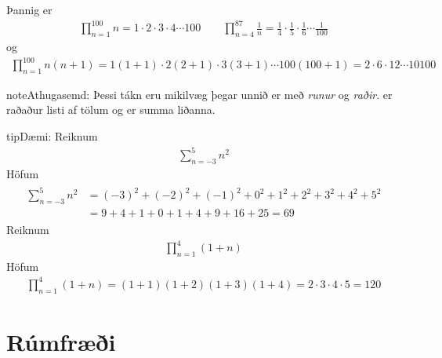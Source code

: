 \documentclass[a4paper,10pt,icelandic]{sphinxmanual}
\begin{document}
Þannig er
\begin{equation*}
\begin{split}\prod_{n=1}^{100}n=1\cdot 2\cdot 3\cdot 4\cdots 100\qquad \prod_{n=4}^{87}\frac{1}{n}=\frac{1}{4}\cdot\frac{1}{5}\cdot\frac{1}{6}\cdots\frac{1}{100}\end{split}
\end{equation*}
og
\begin{equation*}
\begin{split}\prod_{n=1}^{100}n(n+1)=1(1+1)\cdot 2(2+1)\cdot 3(3+1)\cdots 100(100+1)=2\cdot 6\cdot 12 \cdots 10100\end{split}
\end{equation*}
\begin{sphinxadmonition}{note}{Athugasemd:}
Þessi tákn eru mikilvæg þegar unnið er með \textit{runur} og \textit{raðir}.
 er raðaður listi af tölum og  er summa liðanna.
\end{sphinxadmonition}

\begin{sphinxadmonition}{tip}{Dæmi:}
 Reiknum
\begin{equation*}
\begin{split}\sum_{n=-3}^{5}n^2\end{split}
\end{equation*}
Höfum
\begin{equation*}
\begin{split}\begin{aligned}
\sum_{n=-3}^{5}n^2 &=(-3)^2+(-2)^2+(-1)^2+0^2+1^2+2^2+3^2+4^2+5^2 \\ &=9+4+1+0+1+4+9+16+25=69
\end{aligned}\end{split}
\end{equation*}
 Reiknum
\begin{equation*}
\begin{split}\prod_{n=1}^{4}(1+n)\end{split}
\end{equation*}
Höfum
\begin{equation*}
\begin{split}\prod_{n=1}^{4}(1+n)=(1+1)(1+2)(1+3)(1+4)=2\cdot 3\cdot 4\cdot 5=120\end{split}
\end{equation*}\end{sphinxadmonition}


\chapter{Rúmfræði}
\label{\detokenize{Kafli03:rumfraei}}\label{\detokenize{Kafli03::doc}}
\end{document}
